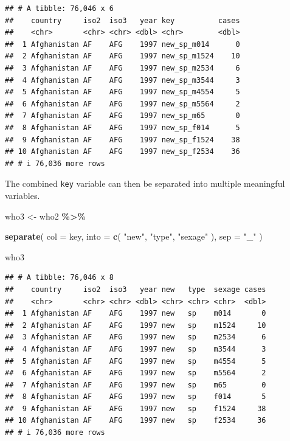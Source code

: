 \documentclass[
  11pt,
  oneside]{book}
\newenvironment{Shaded}{\begin{snugshade}}{\end{snugshade}}
\newcommand{\AttributeTok}[1]{\textcolor[rgb]{0.13,0.29,0.53}{#1}}
\newcommand{\FunctionTok}[1]{\textcolor[rgb]{0.13,0.29,0.53}{\textbf{#1}}}
\newcommand{\NormalTok}[1]{#1}
\newcommand{\OtherTok}[1]{\textcolor[rgb]{0.56,0.35,0.01}{#1}}
\newcommand{\SpecialCharTok}[1]{\textcolor[rgb]{0.81,0.36,0.00}{\textbf{#1}}}
\newcommand{\StringTok}[1]{\textcolor[rgb]{0.31,0.60,0.02}{#1}}
\begin{document}
\begin{verbatim}
## # A tibble: 76,046 x 6
##    country     iso2  iso3   year key          cases
##    <chr>       <chr> <chr> <dbl> <chr>        <dbl>
##  1 Afghanistan AF    AFG    1997 new_sp_m014      0
##  2 Afghanistan AF    AFG    1997 new_sp_m1524    10
##  3 Afghanistan AF    AFG    1997 new_sp_m2534     6
##  4 Afghanistan AF    AFG    1997 new_sp_m3544     3
##  5 Afghanistan AF    AFG    1997 new_sp_m4554     5
##  6 Afghanistan AF    AFG    1997 new_sp_m5564     2
##  7 Afghanistan AF    AFG    1997 new_sp_m65       0
##  8 Afghanistan AF    AFG    1997 new_sp_f014      5
##  9 Afghanistan AF    AFG    1997 new_sp_f1524    38
## 10 Afghanistan AF    AFG    1997 new_sp_f2534    36
## # i 76,036 more rows
\end{verbatim}

The combined \texttt{key} variable can then be separated into multiple meaningful variables.

\begin{Shaded}
\begin{Highlighting}[]
\NormalTok{who3 }\OtherTok{\textless{}{-}}\NormalTok{ who2 }\SpecialCharTok{\%\textgreater{}\%}
  
  \FunctionTok{separate}\NormalTok{(}
    \AttributeTok{col =}\NormalTok{ key,}
    \AttributeTok{into =} \FunctionTok{c}\NormalTok{(}
      \StringTok{"new"}\NormalTok{,}
      \StringTok{"type"}\NormalTok{,}
      \StringTok{"sexage"}
\NormalTok{    ),}
    \AttributeTok{sep =} \StringTok{"\_"}
\NormalTok{  )}

\NormalTok{who3}
\end{Highlighting}
\end{Shaded}

\begin{verbatim}
## # A tibble: 76,046 x 8
##    country     iso2  iso3   year new   type  sexage cases
##    <chr>       <chr> <chr> <dbl> <chr> <chr> <chr>  <dbl>
##  1 Afghanistan AF    AFG    1997 new   sp    m014       0
##  2 Afghanistan AF    AFG    1997 new   sp    m1524     10
##  3 Afghanistan AF    AFG    1997 new   sp    m2534      6
##  4 Afghanistan AF    AFG    1997 new   sp    m3544      3
##  5 Afghanistan AF    AFG    1997 new   sp    m4554      5
##  6 Afghanistan AF    AFG    1997 new   sp    m5564      2
##  7 Afghanistan AF    AFG    1997 new   sp    m65        0
##  8 Afghanistan AF    AFG    1997 new   sp    f014       5
##  9 Afghanistan AF    AFG    1997 new   sp    f1524     38
## 10 Afghanistan AF    AFG    1997 new   sp    f2534     36
## # i 76,036 more rows
\end{verbatim}
\end{document}
